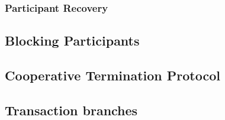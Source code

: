 			\subsubsection{Participant Recovery}
			
			
			
		\subsection{Blocking Participants}
		
		\subsection{Cooperative Termination Protocol}
		
		\subsection{Transaction branches}
		
		
					
			
		
		
		
		
		
		
		
		
		
		
		
			
		
